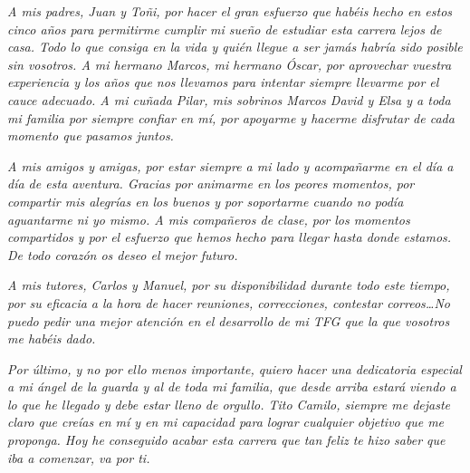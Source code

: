 \begin{flushleft}
    \textit{A mis padres, Juan y Toñi, por hacer el gran esfuerzo que habéis hecho en estos cinco años para permitirme cumplir mi sueño de estudiar esta carrera lejos de casa. Todo lo que consiga en la vida y quién llegue a ser jamás habría sido posible sin vosotros. A mi hermano Marcos, mi hermano Óscar, por aprovechar vuestra experiencia y los años que nos llevamos para intentar siempre llevarme por el cauce adecuado. A mi cuñada Pilar, mis sobrinos Marcos David y Elsa y a toda mi familia por siempre confiar en mí, por apoyarme y hacerme disfrutar de cada momento que pasamos juntos.}

    \textit{A mis amigos y amigas, por estar siempre a mi lado y acompañarme en el día a día de esta aventura. Gracias por animarme en los peores momentos, por compartir mis alegrías en los buenos y por soportarme cuando no podía aguantarme ni yo mismo. A mis compañeros de clase, por los momentos compartidos y por el esfuerzo que hemos hecho para llegar hasta donde estamos. De todo corazón os deseo el mejor futuro.}

    \textit{A mis tutores, Carlos y Manuel, por su disponibilidad durante todo este tiempo, por su eficacia a la hora de hacer reuniones, correcciones, contestar correos\dots No puedo pedir una mejor atención en el desarrollo de mi TFG que la que vosotros me habéis dado.}

    \textit{Por último, y no por ello menos importante, quiero hacer una dedicatoria especial a mi ángel de la guarda y al de toda mi familia, que desde arriba estará viendo a lo que he llegado y debe estar lleno de orgullo. Tito Camilo, siempre me dejaste claro que creías en mí y en mi capacidad para lograr cualquier objetivo que me proponga. Hoy he conseguido acabar esta carrera que tan feliz te hizo saber que iba a comenzar, va por ti.}
\end{flushleft}
